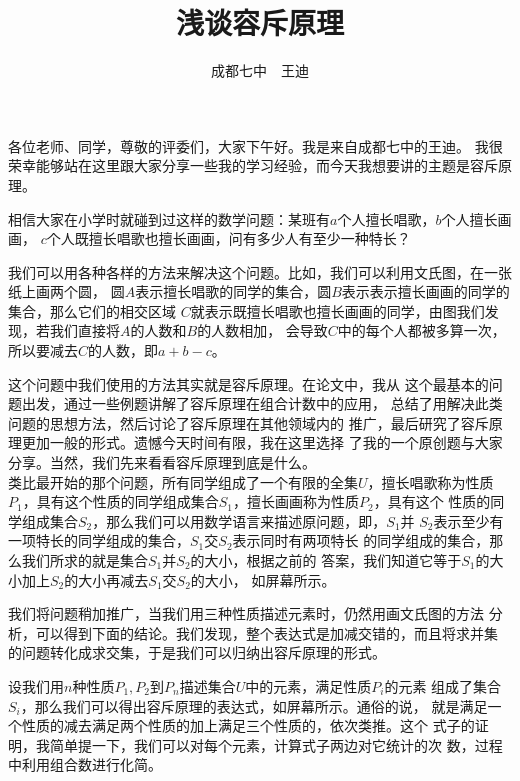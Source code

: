 \documentclass{noithesis}
\begin{document}
\title{浅谈容斥原理}
\author{成都七中~~王迪}

\maketitle

各位老师、同学，尊敬的评委们，大家下午好。我是来自成都七中的王迪。
我很荣幸能够站在这里跟大家分享一些我的学习经验，而今天我想要讲的主题是容斥原理。 \par

相信大家在小学时就碰到过这样的数学问题：某班有$a$个人擅长唱歌，$b$个人擅长画画，
$c$个人既擅长唱歌也擅长画画，问有多少人有至少一种特长？ \par

我们可以用各种各样的方法来解决这个问题。比如，我们可以利用文氏图，在一张纸上画两个圆，
圆$A$表示擅长唱歌的同学的集合，圆$B$表示表示擅长画画的同学的集合，那么它们的相交区域
$C$就表示既擅长唱歌也擅长画画的同学，由图我们发现，若我们直接将$A$的人数和$B$的人数相加，
会导致$C$中的每个人都被多算一次，所以要减去$C$的人数，即$a+b-c$。 \par

这个问题中我们使用的方法其实就是容斥原理。在论文中，我从
这个最基本的问题出发，通过一些例题讲解了容斥原理在组合计数中的应用，
总结了用解决此类问题的思想方法，然后讨论了容斥原理在其他领域内的
推广，最后研究了容斥原理更加一般的形式。遗憾今天时间有限，我在这里选择
了我的一个原创题与大家分享。当然，我们先来看看容斥原理到底是什么。 \\

类比最开始的那个问题，所有同学组成了一个有限的全集$U$，擅长唱歌称为性质
$P_1$，具有这个性质的同学组成集合$S_1$，擅长画画称为性质$P_2$，具有这个
性质的同学组成集合$S_2$，那么我们可以用数学语言来描述原问题，即，$S_1$并
$S_2$表示至少有一项特长的同学组成的集合，$S_1$交$S_2$表示同时有两项特长
的同学组成的集合，那么我们所求的就是集合$S_1$并$S_2$的大小，根据之前的
答案，我们知道它等于$S_1$的大小加上$S_2$的大小再减去$S_1$交$S_2$的大小，
如屏幕所示。 \par

我们将问题稍加推广，当我们用三种性质描述元素时，仍然用画文氏图的方法
分析，可以得到下面的结论。我们发现，整个表达式是加减交错的，而且将求并集
的问题转化成求交集，于是我们可以归纳出容斥原理的形式。 \par

设我们用$n$种性质$P_1,P_2$到$P_n$描述集合$U$中的元素，满足性质$P_i$的元素
组成了集合$S_i$，那么我们可以得出容斥原理的表达式，如屏幕所示。通俗的说，
就是满足一个性质的减去满足两个性质的加上满足三个性质的，依次类推。这个
式子的证明，我简单提一下，我们可以对每个元素，计算式子两边对它统计的次
数，过程中利用组合数进行化简。
\end{document}
